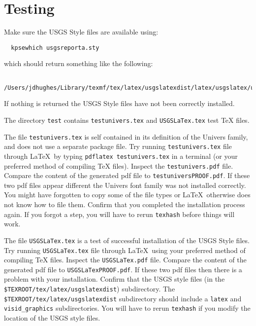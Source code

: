 \documentclass[11pt]{article}
\begin{document}
\section*{\textsf{Testing}}

Make sure the USGS Style files are available using:

\begin{verbatim}
  kpsewhich usgsreporta.sty
\end{verbatim}

\noindent which should return something like the following:

\begin{verbatim}
  /Users/jdhughes/Library/texmf/tex/latex/usgslatexdist/latex/usgslatex/usgsreporta.sty
\end{verbatim}

\noindent If nothing is returned the USGS Style files have not been correctly installed.

The directory \texttt{test} contains \texttt{testunivers.tex} and \texttt{USGSLaTex.tex} test \TeX \hspace{1pt} files. 

The file \texttt{testunivers.tex} is self contained in its definition of the Univers family, and does not use a separate package file. Try running \texttt{testunivers.tex} file through \LaTeX\ by typing \texttt{pdflatex testunivers.tex} in a terminal (or your preferred method of compiling  \TeX \hspace{1pt} files). Inspect the \texttt{testunivers.pdf} file. Compare the content of the generated \textsf{pdf} file to \texttt{testuniversPROOF.pdf}. If these two \textsf{pdf} files appear different the Univers font family was not installed correctly. You might have forgotten to copy some of the file types or \LaTeX\ otherwise does not know how to file them. Confirm that you completed the installation process again. If you forgot a step, you will have to rerun \texttt{texhash} before things will work.

The file \texttt{USGSLaTex.tex} is a test of successful installation of the USGS Style files. Try running \texttt{USGSLaTex.tex} file through \LaTeX\ using your preferred method of compiling  \TeX \hspace{1pt} files. Inspect the \texttt{USGSLaTex.pdf} file. Compare the content of the generated \textsf{pdf} file to \texttt{USGSLaTexPROOF.pdf}. If these two \textsf{pdf} files then there is a problem with your installation. Confirm that the USGS style files (in the \texttt{\$TEXROOT/tex/latex/usgslatexdist}) subdirectory. The \texttt{\$TEXROOT/tex/latex/usgslatexdist} subdirectory should include a \texttt{latex} and \texttt{visid\_graphics} subdirectories. You will have to rerun \texttt{texhash} if you modify the location of the USGS style files.
\end{document}
